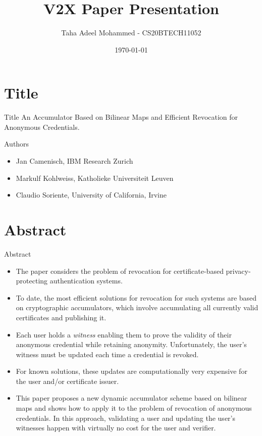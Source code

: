 \documentclass{beamer}
\title{V2X Paper Presentation}
\author{Taha Adeel Mohammed - CS20BTECH11052}
\institute{IITH(CSE)}
\date{\today}
\begin{document}
\section{Title}
\begin{frame}
\titlepage
\end{frame}

\begin{frame}%
    \begin{block}{Title}
    An Accumulator Based on Bilinear Maps and Efficient Revocation for Anonymous Credentials.
    \end{block}
    \begin{block}{Authors}
    \begin{itemize}
        \item Jan Camenisch, IBM Research Zurich
        \item Markulf Kohlweiss, Katholieke Universiteit Leuven
        \item  Claudio Soriente, University of California, Irvine
    \end{itemize}
    \end{block}
\end{frame}

\section{Abstract}
\begin{frame}{Abstract}
    \begin{itemize}
        \justifying
        \item The paper considers the problem of revocation for certificate-based privacy-protecting authentication systems.
        \item To date, the most efficient solutions for revocation for such systems are based on cryptographic accumulators, which involve accumulating all currently valid certificates and publishing it.
        \item Each user holds a \textit{witness} enabling them to prove the validity of their anonymous credential while retaining anonymity. Unfortunately, the user's witness must be updated each time a credential is revoked.
        \item For known solutions, these updates are computationally very expensive for the user and/or certificate issuer.
        \item This paper proposes a new dynamic accumulator scheme based on bilinear maps and shows how to apply it to the problem of revocation of anonymous credentials. In this approach, validating a user and updating the user's witnesses happen with virtually no cost for the user and verifier.   
    \end{itemize}
\end{frame}
\end{document}
